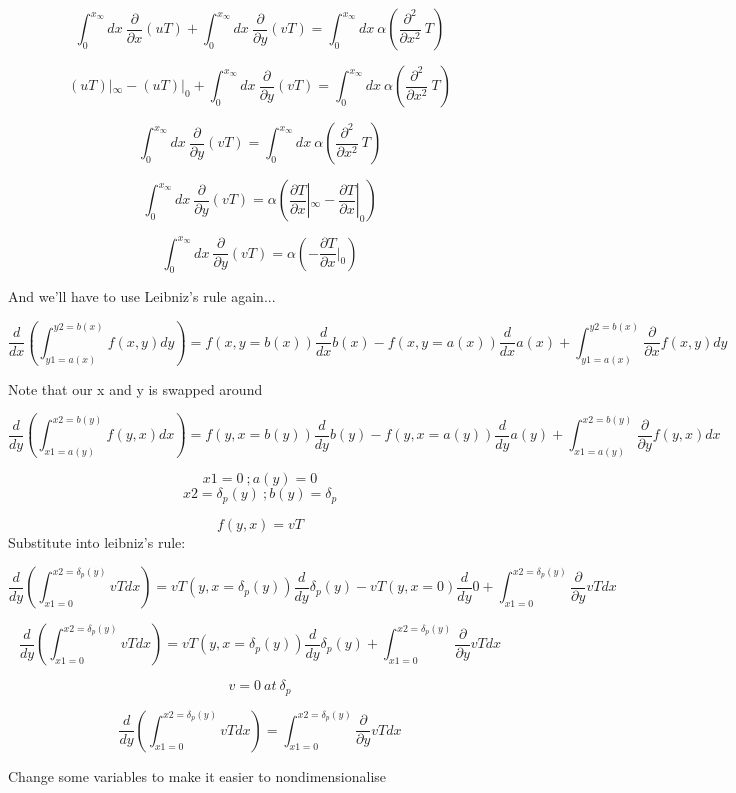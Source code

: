\documentclass[11pt]{article}
\begin{document}
$$\int_0^{x_\infty}  dx\   \frac{\partial}{\partial x}(uT)   + \int_0^{x_\infty}  dx\  \frac{\partial}{\partial y}(vT)  = \int_0^{x_\infty}  dx\  \alpha (\frac{\partial^2 }{\partial x^2} \ T ) $$ 


$$ (uT)|_\infty - (uT)|_0   + \int_0^{x_\infty}  dx\  \frac{\partial}{\partial y}(vT)  = \int_0^{x_\infty}  dx\  \alpha (\frac{\partial^2 }{\partial x^2} \ T ) $$ 

$$  \int_0^{x_\infty}  dx\  \frac{\partial}{\partial y}(vT)  = \int_0^{x_\infty}  dx\  \alpha (\frac{\partial^2 }{\partial x^2} \ T ) $$ 


$$  \int_0^{x_\infty}  dx\  \frac{\partial}{\partial y}(vT)  = \alpha ( \frac{\partial T }{\partial x}|_\infty - \frac{\partial T }{\partial x}|_0 )   $$ 

$$  \int_0^{x_\infty}  dx\  \frac{\partial}{\partial y}(vT)  = \alpha ( - \frac{\partial T }{\partial x}|_0 )   $$ 

And we'll have to use Leibniz's rule again...


$$ \frac{d}{dx} \left( \int_{y1=a(x)}^{y2=b(x)} f(x,y) dy \right)= f(x,y=b(x)) \frac{d}{dx}b(x) - f(x,y=a(x)) \frac{d}{dx} a(x)  +  \int_{y1=a(x)}^{y2=b(x)} \frac{\partial}{\partial x} f(x,y) dy $$

Note that our x and y is swapped around

$$ \frac{d}{dy} \left( \int_{x1=a(y)}^{x2=b(y)} f(y,x) dx \right)= f(y,x=b(y)) \frac{d}{dy}b(y) - f(y,x=a(y)) \frac{d}{dy} a(y)  +  \int_{x1=a(y)}^{x2=b(y)} \frac{\partial}{\partial y} f(y,x) dx $$

$$x1=0 \ ; a(y) = 0$$
$$x2= \delta_p (y) \ ; b(y) = \delta_p$$

$$f(y,x) = vT$$
Substitute into leibniz's rule:

$$ \frac{d}{dy} \left( \int_{x1=0}^{x2=\delta_p(y)} vT dx \right)= vT (y,x=\delta_p(y)) \frac{d}{dy}\delta_p(y) - vT (y,x=0) \frac{d}{dy} 0  +  \int_{x1=0}^{x2=\delta_p(y)} \frac{\partial}{\partial y} vT dx $$


$$ \frac{d}{dy} \left( \int_{x1=0}^{x2=\delta_p(y)} vT dx \right)= vT (y,x=\delta_p(y)) \frac{d}{dy}\delta_p(y)  +  \int_{x1=0}^{x2=\delta_p(y)} \frac{\partial}{\partial y} vT dx $$

$$v=0 \ at \ \delta_p$$

$$ \frac{d}{dy} \left( \int_{x1=0}^{x2=\delta_p(y)} vT dx \right)=   \int_{x1=0}^{x2=\delta_p(y)} \frac{\partial}{\partial y} vT dx $$

Change some variables to make it easier to nondimensionalise 
\end{document}
